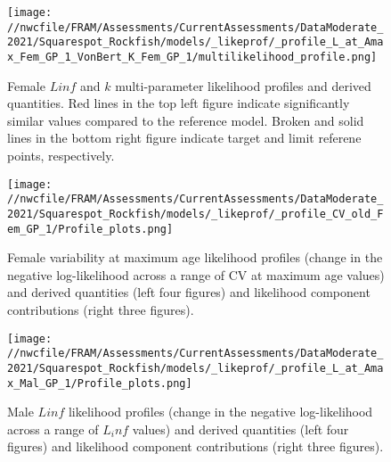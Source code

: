 \documentclass[11pt,
  english,
  a4paper,
]{article}
\begin{document}
\begin{figure}
\centering
\texttt{[image: //nwcfile/FRAM/Assessments/CurrentAssessments/DataModerate\_2021/Squarespot\_Rockfish/models/\_likeprof/\_profile\_L\_at\_Amax\_Fem\_GP\_1\_VonBert\_K\_Fem\_GP\_1/multilikelihood\_profile.png]}
\caption{Female {\(Linf\)\leavevmode\tagmcend\tagstructend} and {\(k\)\leavevmode\tagmcend\tagstructend} multi-parameter likelihood profiles and derived quantities. Red lines in the top left figure indicate significantly similar values compared to the reference model. Broken and solid lines in the bottom right figure indicate target and limit referene points, respectively.\label{fig:Linf_k_f-profile}}
\end{figure}

\tagmcend\tagstructend


\begin{figure}
\centering
\texttt{[image: //nwcfile/FRAM/Assessments/CurrentAssessments/DataModerate\_2021/Squarespot\_Rockfish/models/\_likeprof/\_profile\_CV\_old\_Fem\_GP\_1/Profile\_plots.png]}
\caption{Female variability at maximum age likelihood profiles (change in the negative log-likelihood across a range of CV at maximum age values) and derived quantities (left four figures) and likelihood component contributions (right three figures).\label{fig:CVold_f-profile-combo}}
\end{figure}

\tagmcend\tagstructend


\begin{figure}
\centering
\texttt{[image: //nwcfile/FRAM/Assessments/CurrentAssessments/DataModerate\_2021/Squarespot\_Rockfish/models/\_likeprof/\_profile\_L\_at\_Amax\_Mal\_GP\_1/Profile\_plots.png]}
\caption{Male {\(Linf\)\leavevmode\tagmcend\tagstructend} likelihood profiles (change in the negative log-likelihood across a range of {\(L_inf\)\leavevmode\tagmcend\tagstructend} values) and derived quantities (left four figures) and likelihood component contributions (right three figures).\label{fig:Linf_M-profile-combo}}
\end{figure}
\end{document}
